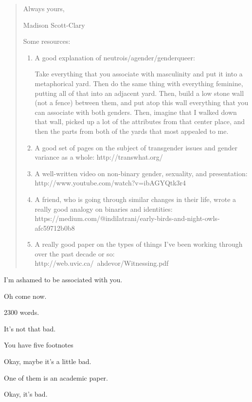 \begin{paracol}{2}
\begin{leftcolumn}
\begin{quotation}
Always yours,

Madison Scott-Clary

Some resources:

\begin{enumerate}
  \item A good explanation of neutrois/agender/genderqueer:

    Take everything that you associate with masculinity and put it into a metaphorical yard. Then do the same thing with everything feminine, putting all of that into an adjacent yard. Then, build a low stone wall (not a fence) between them, and put atop this wall everything that you can associate with both genders. Then, imagine that I walked down that wall, picked up a lot of the attributes from that center place, and then the parts from both of the yards that most appealed to me.

  \item A good set of pages on the subject of transgender issues and gender variance as a whole: http://transwhat.org/

  \item A well-written video on non-binary gender, sexuality, and presentation: http://www.youtube.com/watch?v=ibAGYQtk3r4

  \item A friend, who is going through similar changes in their life, wrote a really good analogy on binaries and identities: https://medium.com/@indilatrani/early-birds-and-night-owls-afc59712b0b8

  \item A really good paper on the types of things I've been working through over the past decade or so: http://web.uvic.ca/~ahdevor/Witnessing.pdf
\end{enumerate}
\end{quotation}

\begin{ally}
I'm ashamed to be associated with you.
\end{ally}
Oh come now.

\begin{ally}
2300 words.
\end{ally}
It's not that bad.

\begin{ally}
You have five footnotes
\end{ally}
Okay, maybe it's a little bad.

\begin{ally}
One of them is an academic paper.
\end{ally}
Okay, it's bad.


\end{leftcolumn}
\end{paracol}
